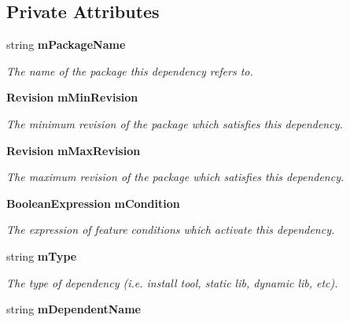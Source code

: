 \subsection*{Private Attributes}
\begin{DoxyCompactItemize}
\item 
string {\bf mPackageName}\label{classPackageDependency_a3b009847300b97cfc6295bd988961816}

\begin{DoxyCompactList}\small\item\em The name of the package this dependency refers to. \item\end{DoxyCompactList}\item 
{\bf Revision} {\bf mMinRevision}\label{classPackageDependency_aa9de7e4359e07a8237838683d4c1a25f}

\begin{DoxyCompactList}\small\item\em The minimum revision of the package which satisfies this dependency. \item\end{DoxyCompactList}\item 
{\bf Revision} {\bf mMaxRevision}\label{classPackageDependency_a6156971e5421135731c0eb72cc4a8a0f}

\begin{DoxyCompactList}\small\item\em The maximum revision of the package which satisfies this dependency. \item\end{DoxyCompactList}\item 
{\bf BooleanExpression} {\bf mCondition}\label{classPackageDependency_a9ee3305e9daa414dc7b35b1c6e49ce76}

\begin{DoxyCompactList}\small\item\em The expression of feature conditions which activate this dependency. \item\end{DoxyCompactList}\item 
string {\bf mType}\label{classPackageDependency_a300b773e33b1b28c2ae31975eb6693ff}

\begin{DoxyCompactList}\small\item\em The type of dependency (i.e. install tool, static lib, dynamic lib, etc). \item\end{DoxyCompactList}\item 
string {\bf mDependentName}\label{classPackageDependency_a2a7136d4206077e515ab861ff73632cd}


\end{DoxyCompactItemize}
